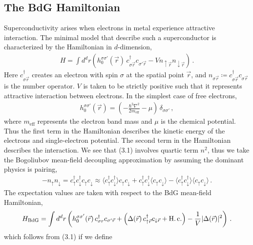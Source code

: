 \documentclass[11pt, oneside]{book}
\theoremstyle{break}
\theoremstyle{break}
\begin{document}
\subsection{The BdG Hamiltonian}
Superconductivity arises when electrons in metal experience attractive interaction. The minimal model that describe such a superconductor is characterized by the Hamiltonian in $d$-dimension,
\begin{align}
H = \int d^d r\left( h_0^{\sigma \sigma'}(\vec{r})\, c_{\sigma \vec{r}}^\dagger c_{\sigma'\vec{r}} - V n_{\uparrow \vec{r}}n_{\downarrow \vec{r}}\right)\,.
\end{align}
Here $c_{\sigma \vec{r}}^\dagger$ creates an electron with spin $\sigma$ at the spatial point $\vec{r}$, and $n_{\sigma \vec{r}}\coloneqq c_{\sigma \vec{r}}^\dagger c_{\sigma \vec{r}}$ is the number operator. $V$ is taken to be strictly positive such that it represents attractive interaction between electrons. In the simplest case of free electrons, 
\begin{align}
h_0^{\sigma \sigma'} (\vec{r}) = \left( 
-\frac{\hbar^2 \nabla^2}{2m_{\text{eff}}} -\mu
\right)\, \delta_{\sigma \sigma'}\,,
\end{align}
where $m_{\text{eff}}$ represents the electron band mass and $\mu$ is the chemical potential. Thus the first term in the Hamiltonian describes the kinetic energy of the electrons and single-electron potential. The second term in the Hamiltonian describes the interaction. We see that (3.1) involves quartic term $n^2$, thus we take the Bogoliubov mean-field decoupling approximation by assuming the dominant physics is pairing, 
\begin{align}
-n_\uparrow n_\downarrow = c^\dagger_\uparrow c^\dagger_\downarrow
c_\uparrow c_\downarrow \approx 
\langle c_{\uparrow}^\dagger c_\downarrow^\dagger\rangle c_\uparrow c_\downarrow + c_\uparrow^\dagger c_\downarrow^\dagger \langle c_\uparrow c_\downarrow\rangle - \langle c_\uparrow^\dagger c_\downarrow^\dagger\rangle \langle c_\uparrow c_\downarrow\rangle\,.
\end{align}
The expectation values are taken with respect to the BdG mean-field Hamiltonian,
\begin{align}
H_{\text{BdG}} = \int d^d r\left( h_0^{\sigma \sigma'}(\vec{r})\, c_{\sigma r}^\dagger c_{\sigma'\vec{r}}
+\left(
\Delta(\vec{r})\, c_{\uparrow\vec{r}}^\dagger c_{\downarrow\vec{r}} + \text{H.\,c.}
\right)-\frac{1}{V}|\Delta(\vec{r})|^2
\right)\,.
\end{align}
which follows from (3.1) if we define
\end{document}
